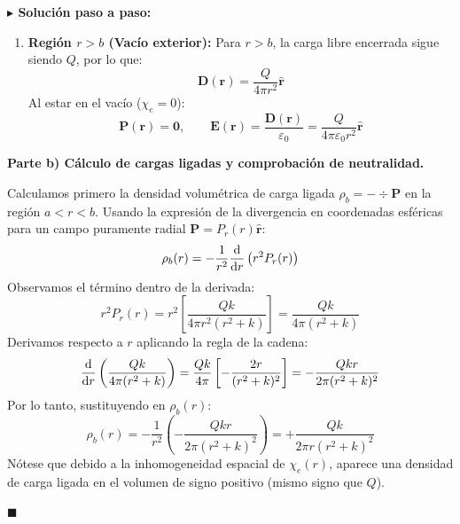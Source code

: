 \documentclass[11pt,a4paper]{book}
\newenvironment{solucion}{%
    \par\medskip\noindent\textbf{\color{blue!65!black}\Large $\blacktriangleright$ Solución paso a paso:}\par\medskip
}{%
    \hfill$\blacksquare$\par\bigskip
}
\newcommand{\rhat}{\hat{\bm{r}}}
\newcommand{\Evec}{\bm{E}}
\newcommand{\Dvec}{\bm{D}}
\newcommand{\Pvec}{\bm{P}}
\begin{document}
\begin{solucion}
\begin{enumerate}[label=\roman*)]
    \item \textbf{Región $r > b$ (Vacío exterior):}
    Para $r > b$, la carga libre encerrada sigue siendo $Q$, por lo que:
    \begin{equation}
        \Dvec(\bm{r}) = \frac{Q}{4\pi r^2}\rhat
    \end{equation}
    Al estar en el vacío ($\chi_e = 0$):
    \begin{equation}
        \Pvec(\bm{r}) = \bm{0}, \qquad \Evec(\bm{r}) = \frac{\Dvec(\bm{r})}{\varepsilon_0} = \frac{Q}{4\pi\varepsilon_0 r^2}\rhat
    \end{equation}
\end{enumerate}

\medskip
\textbf{Parte b) Cálculo de cargas ligadas y comprobación de neutralidad.}

Calculamos primero la densidad volumétrica de carga ligada $\rho_b = -\div{\Pvec}$ en la región $a < r < b$. Usando la expresión de la divergencia en coordenadas esféricas para un campo puramente radial $\Pvec = P_r(r)\rhat$:
\begin{equation}
    \rho_b(r) = -\frac{1}{r^2}\dv{}{r}\left(r^2 P_r(r)\right)
\end{equation}
Observamos el término dentro de la derivada:
\begin{equation}
    r^2 P_r(r) = r^2 \left[\frac{Q k}{4\pi r^2 (r^2 + k)}\right] = \frac{Q k}{4\pi (r^2 + k)}
\end{equation}
Derivamos respecto a $r$ aplicando la regla de la cadena:
\begin{equation}
    \dv{}{r}\left(\frac{Q k}{4\pi (r^2 + k)}\right) = \frac{Q k}{4\pi} \left[ -\frac{2r}{(r^2 + k)^2} \right] = -\frac{Q k r}{2\pi (r^2 + k)^2}
\end{equation}
Por lo tanto, sustituyendo en $\rho_b(r)$:
\begin{equation}
    \rho_b(r) = -\frac{1}{r^2}\left(-\frac{Q k r}{2\pi (r^2 + k)^2}\right) = +\frac{Q k}{2\pi r (r^2 + k)^2}
\end{equation}
Nótese que debido a la inhomogeneidad espacial de $\chi_e(r)$, aparece una densidad de carga ligada en el volumen de signo positivo (mismo signo que $Q$).


\end{solucion}
\end{document}
